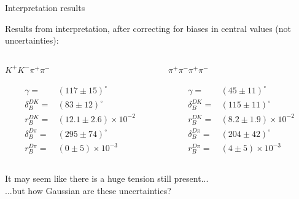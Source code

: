 \documentclass[xcolor={dvipsnames}]{beamer}
\begin{document}
\begin{frame}{Interpretation results}
  \begin{center}
    {\large Results from interpretation, after correcting for biases in central values (not uncertainties):}
  \end{center}
  \vspace{-0.5cm}
  \begin{columns}
    \begin{column}{0.5\textwidth}
      \begin{center}
        $K^+K^-\pi^+\pi^-$
      \end{center}
      \begin{align*}
        \gamma =& (117 \pm 15)^\circ \\
        \delta_B^{DK} =& (83 \pm 12)^\circ \\
        r_B^{DK} =& (12.1 \pm 2.6)\times10^{-2} \\
        \delta_B^{D\pi} =& (295 \pm 74)^\circ \\
        r_B^{D\pi} =& (0 \pm 5)\times10^{-3}
      \end{align*}
    \end{column}
    \begin{column}{0.5\textwidth}
      \begin{center}
        $\pi^+\pi^-\pi^+\pi^-$
      \end{center}
      \begin{align*}
        \gamma =& (45 \pm 11)^\circ \\
        \delta_B^{DK} =& (115 \pm 11)^\circ \\
        r_B^{DK} =& (8.2 \pm 1.9)\times10^{-2} \\
        \delta_B^{D\pi} =& (204 \pm 42)^\circ \\
        r_B^{D\pi} =& (4 \pm 5)\times10^{-3}
      \end{align*}
    \end{column}
  \end{columns}
  \vspace{0.3cm}
  \begin{center}
    It may seem like there is a huge tension still present...\\
    ...but how Gaussian are these uncertainties?
  \end{center}
\end{frame}
\end{document}
